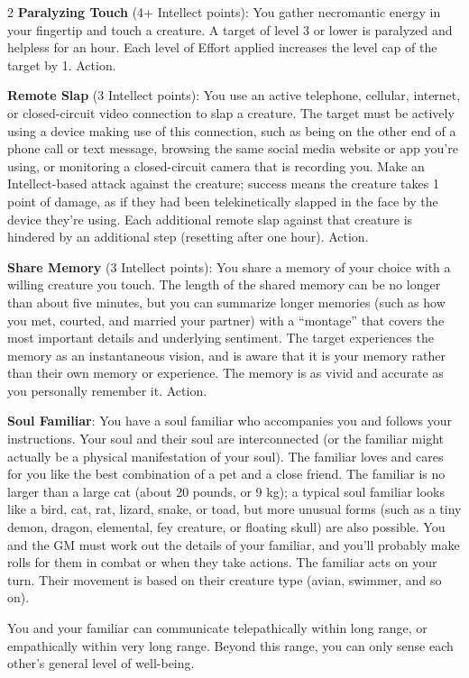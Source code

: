 \begin{multicols}{2}
\textbf{Paralyzing Touch} (4+ Intellect points): You gather necromantic energy in your fingertip and touch a creature. A target of level 3 or lower is paralyzed and helpless for an hour. Each level of Effort applied increases the level cap of the target by 1. Action. 

\textbf{Remote Slap} (3 Intellect points): You use an active telephone, cellular, internet, or closed-circuit video connection to slap a creature. The target must be actively using a device making use of this connection, such as being on the other end of a phone call or text message, browsing the same social media website or app you’re using, or monitoring a closed-circuit camera that is recording you. Make an Intellect-based attack against the creature; success means the creature takes 1 point of damage, as if they had been telekinetically slapped in the face by the device they’re using. Each additional remote slap against that creature is hindered by an additional step (resetting after one hour). Action.

\textbf{Share Memory} (3 Intellect points): You share a memory of your choice with a willing creature you touch. The length of the shared memory can be no longer than about five minutes, but you can summarize longer memories (such as how you met, courted, and married your partner) with a “montage” that covers the most important details and underlying sentiment. The target experiences the memory as an instantaneous vision, and is aware that it is your memory rather than their own memory or experience. The memory is as vivid and accurate as you personally remember it. Action. 

\textbf{Soul Familiar}: You have a soul familiar who accompanies you and follows your instructions. Your soul and their soul are interconnected (or the familiar might actually be a physical manifestation of your soul). The familiar loves and cares for you like the best combination of a pet and a close friend. 
The familiar is no larger than a large cat (about 20 pounds, or 9 kg); a typical soul familiar looks like a bird, cat, rat, lizard, snake, or toad, but more unusual forms (such as a tiny demon, dragon, elemental, fey creature, or floating skull) are also possible. You and the GM must work out the details of your familiar, and you’ll probably make rolls for them in combat or when they take actions. The familiar acts on your turn. Their movement is based on their creature type (avian, swimmer, and so on).

You and your familiar can communicate telepathically within long range, or empathically within very long range. Beyond this range, you can only sense each other’s general level of well-being. 


\end{multicols}
